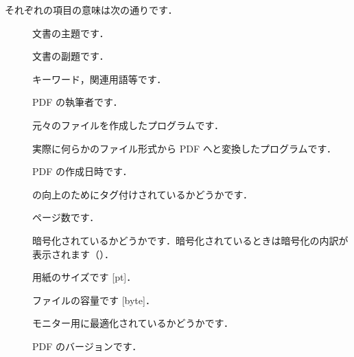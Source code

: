 それぞれの項目の意味は次の通りです．

\begin{description}
 \item[]
    文書の主題です．
 \item[]
    文書の副題です．
 \item[]
    キーワード，関連用語等です．
 \item[]
    PDF の執筆者です．
 \item[]
    元々のファイルを作成したプログラムです．
 \item[]
    実際に何らかのファイル形式から PDF へと変換したプログラムです．
 \item[]
    PDF の作成日時です．
 \item[]
%
    の向上のためにタグ付けされているかどうかです．
 \item[]
    ページ数です．
 \item[]
    暗号化されているかどうかです．暗号化されているときは暗号化の内訳が
    表示されます（）．
 \item[]
%
    用紙のサイズです [pt]．
 \item[]
    ファイルの容量です [byte]．
 \item[]
    モニター用に最適化されているかどうかです．
 \item[]
    PDF のバージョンです．%
\end{description}

